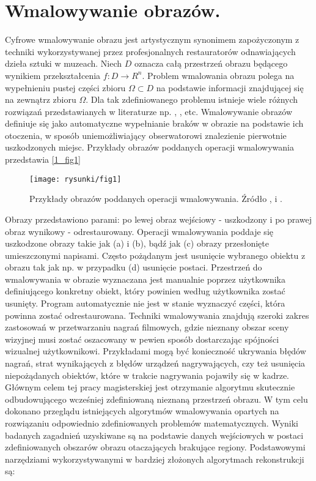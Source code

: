 \documentclass[12pt, twoside, openany]{report}
\theoremstyle{definition}
\begin{document}
\section{Wmalowywanie obrazów.}
Cyfrowe wmalowywanie obrazu jest artystycznym synonimem zapożyczonym z techniki wykorzystywanej przez profesjonalnych restauratorów odnawiających dzieła sztuki w muzeach. Niech $D$ oznacza całą przestrzeń obrazu będącego wynikiem przekształcenia $f: D \rightarrow R^{n}$. Problem wmalowania obrazu polega na wypełnieniu pustej części zbioru $\Omega \subset D$ na podstawie informacji znajdującej się na zewnątrz zbioru $\Omega$. Dla tak zdefiniowanego problemu istnieje wiele różnych rozwiązań przedstawianych w literaturze np. \cite{SalientStrucTexProp}, \cite{BertalmioNavierStokes}, \cite{arias2011variational} etc. Wmalowywanie obrazów definiuje się jako automatyczne wypełnianie braków w obrazie na podstawie ich otoczenia, w sposób uniemożliwiający obserwatorowi znalezienie pierwotnie uszkodzonych miejsc. Przykłady obrazów poddanych operacji wmalowywania przedstawia \autoref{1_fig1} 
\begin{figure}[!h]
	\centering
	\texttt{[image: rysunki/fig1]}
	\caption{Przykłady obrazów poddanych operacji wmalowywania. Źródło \cite{BertalmioNavierStokes}, \cite{bertalmio2000image} i \cite{patwardhan2007video}.}
	\label{1_fig1}
\end{figure}
\par
Obrazy przedstawiono parami: po lewej obraz wejściowy - uszkodzony i po prawej obraz wynikowy - odrestaurowany. Operacji wmalowywania poddaje się uszkodzone obrazy takie jak (a) i (b), bądź jak (c) obrazy przesłonięte umieszczonymi napisami. Często pożądanym jest usunięcie wybranego obiektu z obrazu tak jak np. w przypadku (d) usunięcie postaci. Przestrzeń do wmalowywania w obrazie wyznaczana jest manualnie poprzez użytkownika definiującego konkretny obiekt, który powinien według użytkownika zostać usunięty. Program automatycznie nie jest w stanie wyznaczyć części, która powinna zostać odrestaurowana. 
Techniki wmalowywania znajdują szeroki zakres zastosowań w przetwarzaniu nagrań filmowych, gdzie nieznany obszar sceny wizyjnej musi zostać oszacowany w pewien sposób dostarczając spójności wizualnej użytkownikowi. Przykładami mogą być konieczność ukrywania błędów nagrań, strat wynikających z błędów urządzeń nagrywających, czy też usunięcia niepożądanych obiektów, które w trakcie nagrywania pojawiły się w kadrze. Głównym celem tej pracy magisterskiej jest otrzymanie algorytmu skutecznie odbudowującego wcześniej zdefiniowaną nieznaną przestrzeń obrazu. W tym celu dokonano przeglądu istniejących algorytmów wmalowywania opartych na rozwiązaniu odpowiednio zdefiniowanych problemów matematycznych. Wyniki badanych zagadnień uzyskiwane są na podstawie danych wejściowych w postaci zdefiniowanych obszarów obrazu otaczających brakujące regiony. Podstawowymi narzędziami wykorzystywanymi w bardziej złożonych algorytmach rekonstrukcji są:
\end{document}
